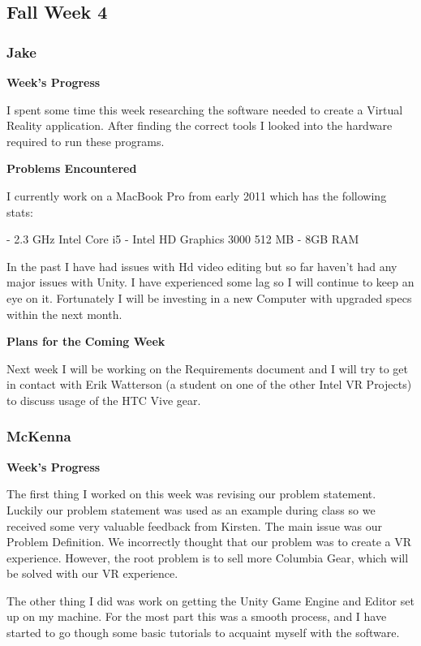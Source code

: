 \documentclass[10pt,journal,compsoc,onecolumn, draftclsnofoot]{IEEEtran}
\begin{document}
\subsection{Fall Week 4}
\subsubsection{Jake}
\noindent \textbf{Week's Progress}

I spent some time this week researching the software needed to create a Virtual Reality application. After finding the correct tools I looked into the hardware required to run these programs.

\noindent \textbf{Problems Encountered}

I currently work on a MacBook Pro from early 2011 which has the following stats:

- 2.3 GHz Intel Core i5
- Intel HD Graphics 3000 512 MB
- 8GB RAM

In the past I have had issues with Hd video editing but so far haven't had any major issues with Unity. I have experienced some lag so I will continue to keep an eye on it. Fortunately I will be investing in a new Computer with upgraded specs within the next month.

\noindent \textbf{Plans for the Coming Week}

Next week I will be working on the Requirements document and I will try to get in contact with Erik Watterson (a student on one of the other Intel VR Projects) to discuss usage of the HTC Vive gear.

\subsubsection{McKenna}
\noindent \textbf{Week's Progress}

The first thing I worked on this week was revising our problem statement. Luckily our problem statement was used as an example during class so we received some very valuable feedback from Kirsten. The main issue was our Problem Definition. We incorrectly thought that our problem was to create a VR experience. However, the root problem is to sell more Columbia Gear, which will be solved with our VR experience.

The other thing I did was work on getting the Unity Game Engine and Editor set up on my machine. For the most part this was a smooth process, and I have started to go though some basic tutorials to acquaint myself with the software.
\end{document}
